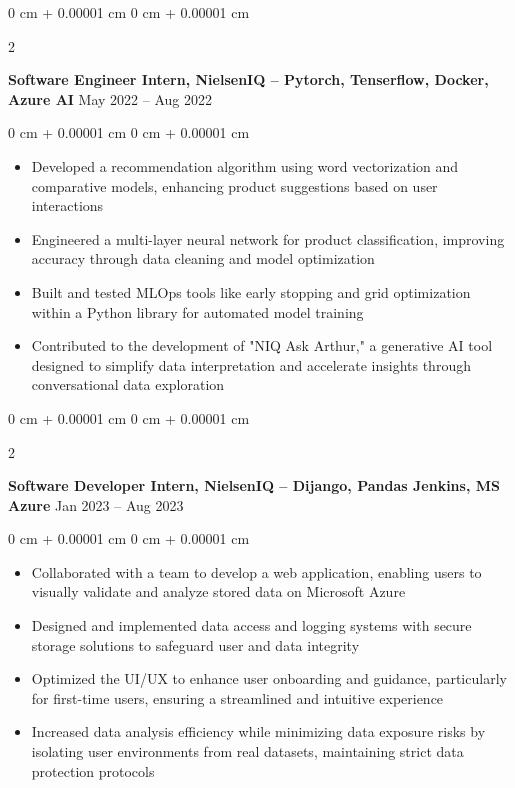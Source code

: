 \documentclass[10pt, letterpaper]{article}
\newenvironment{highlights}{
    \begin{itemize}[
        topsep=0.10 cm,
        parsep=0.10 cm,
        partopsep=0pt,
        itemsep=0pt,
        leftmargin=0 cm + 10pt
    ]
}{
    \end{itemize}
} %
\newenvironment{onecolentry}{
    \begin{adjustwidth}{
        0 cm + 0.00001 cm
    }{
        0 cm + 0.00001 cm
    }
}{
    \end{adjustwidth}
} %
\newenvironment{twocolentry}[2][]{
    \onecolentry
    \def\secondColumn{#2}
    \setcolumnwidth{\fill, 4.5 cm}
    \begin{paracol}{2}
}{
    \switchcolumn \raggedleft \secondColumn
    \end{paracol}
    \endonecolentry
} %
\begin{document}
        
        \begin{twocolentry}{
            May 2022 – Aug 2022
        }
            \textbf{Software Engineer Intern, NielsenIQ -- Pytorch, Tenserflow, Docker, Azure AI}\end{twocolentry}

        \vspace{0.10 cm}
        \begin{onecolentry}
            \begin{highlights}
                \item Developed a recommendation algorithm using word vectorization and comparative models, enhancing product suggestions based on user interactions
                \item Engineered a multi-layer neural network for product classification, improving accuracy through data cleaning and model optimization
                \item Built and tested MLOps tools like early stopping and grid optimization within a Python library for automated model training
                \item Contributed to the development of "NIQ Ask Arthur," a generative AI tool designed to simplify data interpretation and accelerate insights through conversational data exploration
            \end{highlights}
        \end{onecolentry}
        

        \vspace{0.2 cm}

        \begin{twocolentry}{
            Jan 2023 – Aug 2023
        }
            \textbf{Software Developer Intern, NielsenIQ -- Dijango, Pandas Jenkins, MS Azure} \end{twocolentry}

        \vspace{0.10 cm}
        \begin{onecolentry}
            \begin{highlights}
                \item Collaborated with a team to develop a web application, enabling users to visually validate and analyze stored data on Microsoft Azure
                \item Designed and implemented data access and logging systems with secure storage solutions to safeguard user and data integrity
                \item Optimized the UI/UX to enhance user onboarding and guidance, particularly for first-time users, ensuring a streamlined and intuitive experience
                \item Increased data analysis efficiency while minimizing data exposure risks by isolating user environments from real datasets, maintaining strict data protection protocols
            \end{highlights}
        \end{onecolentry}
\end{document}
